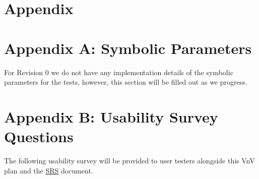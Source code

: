 \documentclass[12pt, titlepage]{article}
\begin{document}
\newpage

\section{Appendix}
\section*{Appendix A: Symbolic Parameters}
For Revision 0 we do not have any implementation details of the symbolic parameters for the tests, however, this section will be filled out as we progress.
\section*{Appendix B: Usability Survey Questions}
The following usability survey will be provided to user testers alongside 
this VnV plan and the \href{https://github.com/emilyperica/ScoreGen/blob/main/docs/SRS-Volere/SRS.pdf}{SRS} document.
\end{document}
